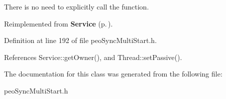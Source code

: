 There is no need to explicitly call the function. 

Reimplemented from {\bf Service} {\rm (p.\,\pageref{class_service_f94cc8a5c2665d4574041737e61e9ffc})}.

Definition at line 192 of file peo\-Sync\-Multi\-Start.h.

References Service::get\-Owner(), and Thread::set\-Passive().

The documentation for this class was generated from the following file:\begin{CompactItemize}
\item 
peo\-Sync\-Multi\-Start.h\end{CompactItemize}
